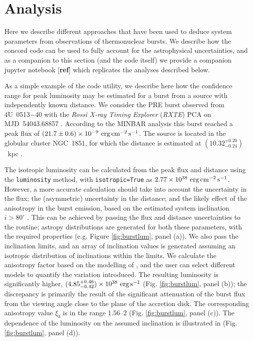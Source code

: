 \documentclass{aastex63}
\newcommand{\eps}{{\rm erg\,s^{-1}}}
\newcommand{\epcs}{{\rm erg\,cm^{-2}\,s^{-1}}}
\begin{document}
\section{Analysis} 
\label{sec:analysis}



Here we describe different approaches that have been used to deduce system parameters from observations of thermonuclear bursts.
%
We describe how the {\sc concord} code can be used to fully account for the astrophysical uncertainties, and as a companion to this section (and the code itself) we provide a companion {\sc jupyter} notebook [{\bf ref}] which replicates the analyses described below.


As a simple example of the code utility, we describe here how the confidence range for peak luminosity may be estimated for a burst from a source with independently known distance. We consider the PRE burst observed from 4U~0513$-$40 with the {\it Rossi X-ray Timing Explorer} ({\it RXTE}) PCA on MJD~54043.68857 \cite[observation ID 92403-01-15-04; MINBAR ID \#3443;][]{minbar}. According to the MINBAR analysis this burst reached a peak flux of $(21.7\pm0.6)\times10^{-9}\ \epcs$. The source is located in the globular cluster NGC~1851, for which the distance is estimated at $(10.32^{+0.20}_{-0.24})$~kpc \cite[]{WatkinsEtAl2015}.

The isotropic luminosity can be calculated from the peak flux and distance using the {\tt luminosity} method, with {\tt isotropic=True} as $2.77\times10^{38}\ \epcs$. 
%
However, a more accurate calculation should take into account the uncertainty in the flux; the (asymmetric) uncertainty in the distance; and the likely effect of the anisotropy in the burst emission, based on the estimated system inclination $i>80^\circ$ \cite[]{fiocchi11}. This can be achieved by passing the flux and distance uncertainties to the routine; {\sc astropy} distributions are generated for both these parameters, with the required properties (e.g. Figure \ref{fig:burstlum}, panel (a)). We also pass the inclination limits, and an array of inclination values is generated assuming an isotropic distribution of inclinations within the limits. We calculate the anisotropy factor based on the modelling of \cite{he16}, and the user can select different models to quantify the variation introduced.
%
The resulting luminosity is significantly higher, $(4.85_{-0.42}^{+0.46})\times10^{38}\ \eps$ (Fig. \ref{fig:burstlum}, panel (b)); the discrepancy is primarily the result of the significant attenuation of the burst flux from the viewing angle close to the plane of the accretion disk. The corresponding anisotropy value $\xi_b$ is in the range 1.56--2 (Fig. \ref{fig:burstlum}, panel (c)). The dependence of the luminosity on the assumed inclination is illustrated in (Fig. \ref{fig:burstlum}, panel (d)). 
\end{document}

